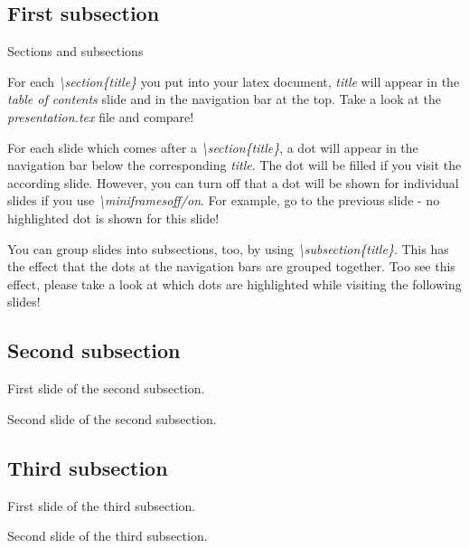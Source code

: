 \subsection{First subsection}

\begin{frame}{Sections and subsections}

  For each \textit{\textbackslash section\{title\}} you put into your latex document, \textit{title} will appear in the \textit{table of contents} slide and in the navigation bar at the top. Take a look at the \textit{presentation.tex} file and compare! \\
  
  \vspace{0.4cm}
  
  For each slide which comes after a \textit{\textbackslash section\{title\}}, a dot will appear in the navigation bar below the corresponding \textit{title}. The dot will be filled if you visit the according slide. However, you can turn  off that a dot will be shown for individual slides if you use \textit{\textbackslash miniframesoff/on}. For example, go to the previous slide - no highlighted dot is shown for this slide!
    
  \vspace{0.4cm}
  
  You can group slides into subsections, too, by using \textit{\textbackslash subsection\{title\}}. This has the effect that the dots at the navigation bars are grouped together. Too see this effect, please take a look at which dots are highlighted while visiting the following slides!
  
\end{frame}

\subsection{Second subsection}

\begin{frame}{}

  First slide of the second subsection.

\end{frame}

\begin{frame}{}

  Second slide of the second subsection.

\end{frame}

\subsection{Third subsection}

\begin{frame}{}

  First slide of the third subsection.

\end{frame}

\begin{frame}{}

  Second slide of the third subsection.

\end{frame}